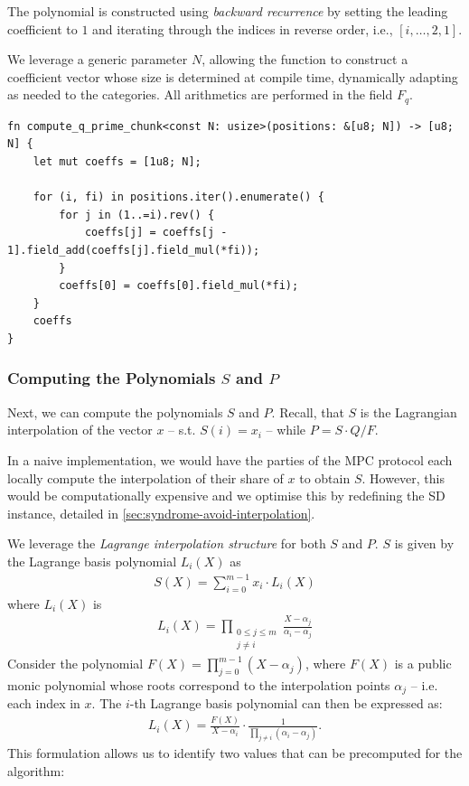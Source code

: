 \documentclass[11pt]{report}
\theoremstyle{definition}
\theoremstyle{plain}
\begin{document}
The polynomial is constructed using \textit{backward recurrence} by setting the leading coefficient to $1$ and iterating through the indices in reverse order, i.e., $[i, \dots, 2, 1]$.

We leverage a generic parameter $N$, allowing the function to construct a coefficient vector whose size is determined at compile time, dynamically adapting as needed to the categories. All arithmetics are performed in the field $F_q$.

\begin{verbatim}
fn compute_q_prime_chunk<const N: usize>(positions: &[u8; N]) -> [u8; N] {
    let mut coeffs = [1u8; N];

    for (i, fi) in positions.iter().enumerate() {
        for j in (1..=i).rev() {
            coeffs[j] = coeffs[j - 1].field_add(coeffs[j].field_mul(*fi));
        }
        coeffs[0] = coeffs[0].field_mul(*fi);
    }
    coeffs
}
\end{verbatim}

\subsubsection{Computing the Polynomials $S$ and $P$}

Next, we can compute the polynomials $S$ and $P$. Recall, that $S$ is the Lagrangian interpolation of the vector $x$ -- s.t. $S(i) = x_i$ -- while $P = S \cdot Q / F$.

In a naive implementation, we would have the parties of the MPC protocol each locally compute the interpolation of their share of $x$ to obtain $S$. However, this would be computationally expensive and we optimise this by redefining the SD instance, detailed in \autoref{sec:syndrome-avoid-interpolation}.

We leverage the \textit{Lagrange interpolation structure} for both $S$ and $P$. $S$ is given by the Lagrange basis polynomial $L_i(X)$ as
\begin{align*}
  S(X) = \sum_{i=0}^{m-1} x_i \cdot L_i(X)
\end{align*}
where $L_i(X)$ is
\begin{align*}
  L_i(X) = \prod_{\substack{0\leq j\leq m \\ j\neq i}} \frac{X-\alpha_j}{\alpha_i-\alpha_j}
\end{align*}
Consider the polynomial $F(X) = \prod_{j=0}^{m-1} (X - \alpha_j)$, where $F(X)$ is a public monic polynomial whose roots correspond to the interpolation points $\alpha_j$ -- i.e. each index in $x$. The $i$-th Lagrange basis polynomial can then be expressed as:
\begin{align*}
  L_i(X) = \frac{F(X)}{X - \alpha_i} \cdot \frac{1}{\prod_{j \neq i} (\alpha_i - \alpha_j)}.
\end{align*}
This formulation allows us to identify two values that can be precomputed for the algorithm:
\end{document}
